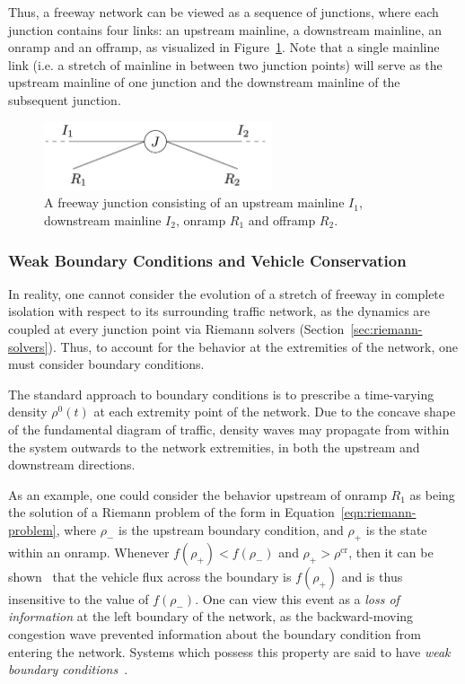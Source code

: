 Thus, a freeway network can be viewed as a sequence of junctions, where each junction contains four links: an upstream mainline, a downstream mainline, an onramp and an offramp, as visualized in Figure~\ref{fig:simple-junction}. Note that a single mainline link (i.e. a stretch of mainline in between two junction points) will serve as the upstream mainline of one junction and the downstream mainline of the subsequent junction.

\begin{figure}[htbp]
	\centering
	\includegraphics[width=0.6\textwidth]{diagrams/simple-junction}
	\caption{A freeway junction consisting of an upstream mainline $I_1$, downstream mainline $I_2$, onramp $R_1$ and offramp $R_2$.}
	\label{fig:simple-junction}
\end{figure}

\subsubsection{Weak Boundary Conditions and Vehicle Conservation}

In reality, one cannot consider the evolution of a stretch of freeway in complete isolation with respect to its surrounding traffic network, as the dynamics are coupled at every junction point via Riemann solvers (Section~\ref{sec:riemann-solvers}). Thus, to account for the behavior at the extremities of the network, one must consider boundary conditions.

The standard approach to boundary conditions is to prescribe a time-varying density $\rho^0\left(t\right)$ at each extremity point of the network. Due to the concave shape of the fundamental diagram of traffic, density waves may propagate from within the system outwards to the network extremities, in both the upstream and downstream directions.

As an example, one could consider the behavior upstream of onramp $R_1$ as being the solution of a Riemann problem of the form in Equation~\eqref{eqn:riemann-problem}, where $\rho_-$ is the upstream boundary condition, and $\rho_+$ is the state within an onramp. Whenever $f\left(\rho_+\right)<f\left(\rho_-\right)$ and $\rho_+ > \rho^{\text{cr}}$, then it can be shown~\cite{lebacque1996godunov,garavello2006traffic} that the vehicle flux across the boundary is $f\left(\rho_+\right)$ and is thus insensitive to the value of $f\left(\rho_-\right)$. One can view this event as a \emph{loss of information} at the left boundary of the network, as the backward-moving congestion wave prevented information about the boundary condition from entering the network. Systems which possess this property are said to have \emph{weak boundary conditions}~\cite{strub2006weak}.

